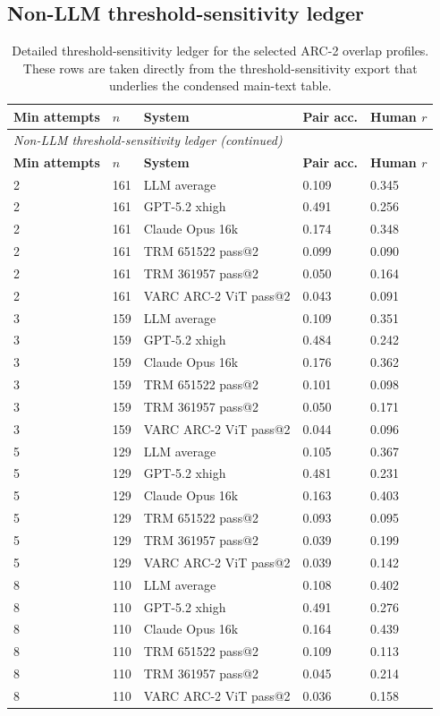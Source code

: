 \subsection{Non-LLM threshold-sensitivity ledger}

{\scriptsize
\begin{longtable}{p{0.5in}p{0.5in}p{2.25in}p{0.7in}p{0.7in}}
\caption{Detailed threshold-sensitivity ledger for the selected ARC-2 overlap profiles. These rows are taken directly from the threshold-sensitivity export that underlies the condensed main-text table.} \\
\toprule
\textbf{Min attempts} & \textbf{$n$} & \textbf{System} & \textbf{Pair acc.} & \textbf{Human $r$} \\
\midrule
\endfirsthead
\multicolumn{5}{l}{\small\itshape Non-LLM threshold-sensitivity ledger (continued)} \\
\toprule
\textbf{Min attempts} & \textbf{$n$} & \textbf{System} & \textbf{Pair acc.} & \textbf{Human $r$} \\
\midrule
\endhead
2 & 161 & LLM average & 0.109 & 0.345 \\
2 & 161 & GPT-5.2 xhigh & 0.491 & 0.256 \\
2 & 161 & Claude Opus 16k & 0.174 & 0.348 \\
2 & 161 & TRM 651522 pass@2 & 0.099 & 0.090 \\
2 & 161 & TRM 361957 pass@2 & 0.050 & 0.164 \\
2 & 161 & VARC ARC-2 ViT pass@2 & 0.043 & 0.091 \\
3 & 159 & LLM average & 0.109 & 0.351 \\
3 & 159 & GPT-5.2 xhigh & 0.484 & 0.242 \\
3 & 159 & Claude Opus 16k & 0.176 & 0.362 \\
3 & 159 & TRM 651522 pass@2 & 0.101 & 0.098 \\
3 & 159 & TRM 361957 pass@2 & 0.050 & 0.171 \\
3 & 159 & VARC ARC-2 ViT pass@2 & 0.044 & 0.096 \\
5 & 129 & LLM average & 0.105 & 0.367 \\
5 & 129 & GPT-5.2 xhigh & 0.481 & 0.231 \\
5 & 129 & Claude Opus 16k & 0.163 & 0.403 \\
5 & 129 & TRM 651522 pass@2 & 0.093 & 0.095 \\
5 & 129 & TRM 361957 pass@2 & 0.039 & 0.199 \\
5 & 129 & VARC ARC-2 ViT pass@2 & 0.039 & 0.142 \\
8 & 110 & LLM average & 0.108 & 0.402 \\
8 & 110 & GPT-5.2 xhigh & 0.491 & 0.276 \\
8 & 110 & Claude Opus 16k & 0.164 & 0.439 \\
8 & 110 & TRM 651522 pass@2 & 0.109 & 0.113 \\
8 & 110 & TRM 361957 pass@2 & 0.045 & 0.214 \\
8 & 110 & VARC ARC-2 ViT pass@2 & 0.036 & 0.158 \\
\bottomrule
\end{longtable}
}

